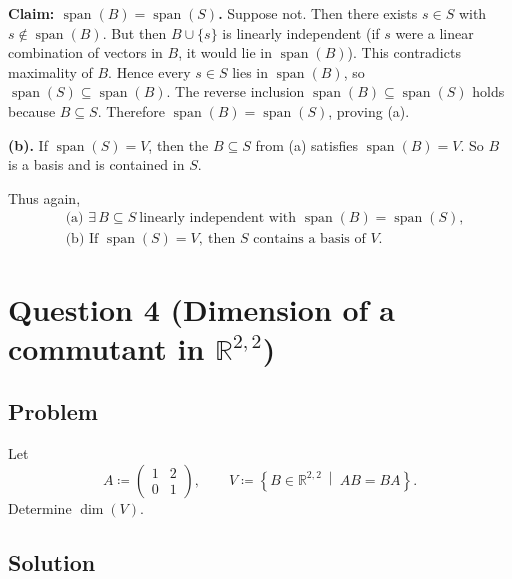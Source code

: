 \documentclass[12pt]{article}
\newcommand{\R}{\mathbb{R}}
\newcommand{\Span}{\operatorname{span}}
\newcommand{\dimn}{\operatorname{dim}}
\begin{document}
\textbf{Claim: \(\Span(B)=\Span(S)\).}
Suppose not. Then there exists \(s\in S\) with \(s\notin \Span(B)\).
But then \(B\cup\{s\}\) is linearly independent (if \(s\) were a linear combination of vectors in \(B\), it would lie in \(\Span(B)\)).
This contradicts maximality of \(B\).
Hence every \(s\in S\) lies in \(\Span(B)\), so \(\Span(S)\subseteq \Span(B)\).
The reverse inclusion \(\Span(B)\subseteq \Span(S)\) holds because \(B\subseteq S\).
Therefore \(\Span(B)=\Span(S)\), proving (a).

\textbf{(b).}
If \(\Span(S)=V\), then the \(B\subseteq S\) from (a) satisfies \(\Span(B)=V\).
So \(B\) is a basis and is contained in \(S\).

Thus again,
\[
\boxed{
\begin{aligned}
&\text{(a) } \exists\,B\subseteq S\ \text{linearly independent with } \Span(B)=\Span(S),\\
&\text{(b) If }\Span(S)=V,\ \text{then } S \text{ contains a basis of }V.
\end{aligned}}
\]

\newpage
\section{Question 4 (Dimension of a commutant in \(\R^{2,2}\))}
\subsection{Problem}
Let
\[
A \coloneqq
\begin{pmatrix}
1 & 2\\
0 & 1
\end{pmatrix},
\qquad
V \coloneqq \left\{B\in \R^{2,2}\ \middle|\ AB=BA\right\}.
\]
Determine \(\dimn(V)\).

\subsection{Solution}
\end{document}
